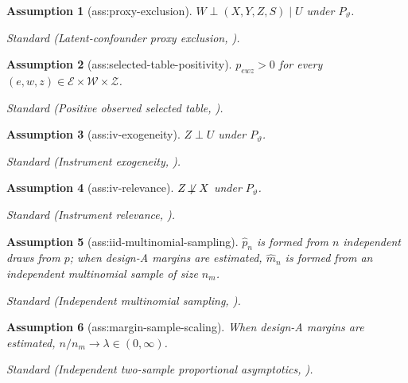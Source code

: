 \documentclass{article}
\newtheorem{assumption}{Assumption}
\begin{document}
\begin{assumption}[ass:proxy-exclusion]\label{ass:proxy-exclusion}
\(W\perp(X,Y,Z,S)\mid U\) under \(P_{\vartheta}\).
\par\smallskip\noindent\emph{Standard} (Latent-confounder proxy exclusion, \cite{ShingakiYoshidaKuroki2026}).
\end{assumption}

\begin{assumption}[ass:selected-table-positivity]\label{ass:selected-table-positivity}
\(p_{ewz}>0\) for every \((e,w,z)\in\mathcal E\times\mathcal W\times\mathcal Z\).
\par\smallskip\noindent\emph{Standard} (Positive observed selected table, \cite{ShingakiYoshidaKuroki2026}).
\end{assumption}

\begin{assumption}[ass:iv-exogeneity]\label{ass:iv-exogeneity}
\(Z\perp U\) under \(P_{\vartheta}\).
\par\smallskip\noindent\emph{Standard} (Instrument exogeneity, \cite{ShingakiYoshidaKuroki2026}).
\end{assumption}

\begin{assumption}[ass:iv-relevance]\label{ass:iv-relevance}
\(Z\not\!\perp X\) under \(P_{\vartheta}\).
\par\smallskip\noindent\emph{Standard} (Instrument relevance, \cite{ShingakiYoshidaKuroki2026}).
\end{assumption}

\begin{assumption}[ass:iid-multinomial-sampling]\label{ass:iid-multinomial-sampling}
\(\widehat p_n\) is formed from \(n\) independent draws from \(p\); when design-A margins are estimated, \(\widehat m_n\) is formed from an independent multinomial sample of size \(n_m\).
\par\smallskip\noindent\emph{Standard} (Independent multinomial sampling, \cite{TurnerGrunwald2022}).
\end{assumption}

\begin{assumption}[ass:margin-sample-scaling]\label{ass:margin-sample-scaling}
When design-A margins are estimated, \(n/n_m\to\lambda\in(0,\infty)\).
\par\smallskip\noindent\emph{Standard} (Independent two-sample proportional asymptotics, \cite{vanDerVaart1998}).
\end{assumption}
\end{document}
